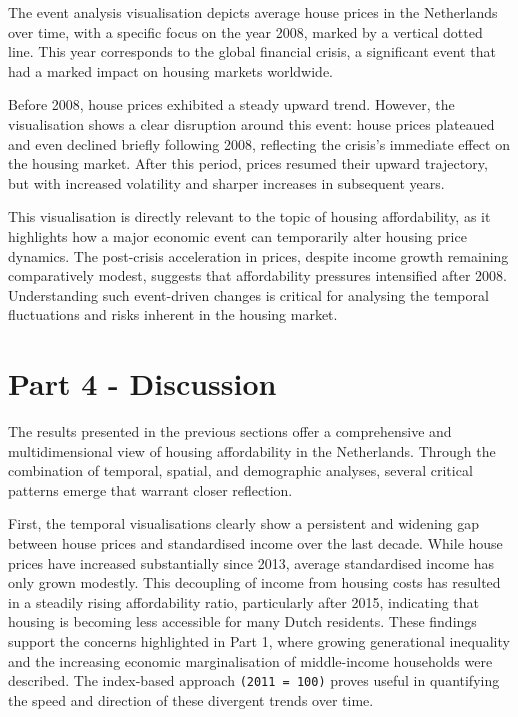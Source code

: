 \documentclass[
]{article}
\begin{document}
The event analysis visualisation depicts average house prices in the
Netherlands over time, with a specific focus on the year 2008, marked by
a vertical dotted line. This year corresponds to the global financial
crisis, a significant event that had a marked impact on housing markets
worldwide.

Before 2008, house prices exhibited a steady upward trend. However, the
visualisation shows a clear disruption around this event: house prices
plateaued and even declined briefly following 2008, reflecting the
crisis's immediate effect on the housing market. After this period,
prices resumed their upward trajectory, but with increased volatility
and sharper increases in subsequent years.

This visualisation is directly relevant to the topic of housing
affordability, as it highlights how a major economic event can
temporarily alter housing price dynamics. The post-crisis acceleration
in prices, despite income growth remaining comparatively modest,
suggests that affordability pressures intensified after 2008.
Understanding such event-driven changes is critical for analysing the
temporal fluctuations and risks inherent in the housing market.

\section{Part 4 - Discussion}\label{part-4---discussion}

The results presented in the previous sections offer a comprehensive and
multidimensional view of housing affordability in the Netherlands.
Through the combination of temporal, spatial, and demographic analyses,
several critical patterns emerge that warrant closer reflection.

First, the temporal visualisations clearly show a persistent and
widening gap between house prices and standardised income over the last
decade. While house prices have increased substantially since 2013,
average standardised income has only grown modestly. This decoupling of
income from housing costs has resulted in a steadily rising
affordability ratio, particularly after 2015, indicating that housing is
becoming less accessible for many Dutch residents. These findings
support the concerns highlighted in Part 1, where growing generational
inequality and the increasing economic marginalisation of middle-income
households were described. The index-based approach
\texttt{(2011\ =\ 100)} proves useful in quantifying the speed and
direction of these divergent trends over time.
\end{document}
